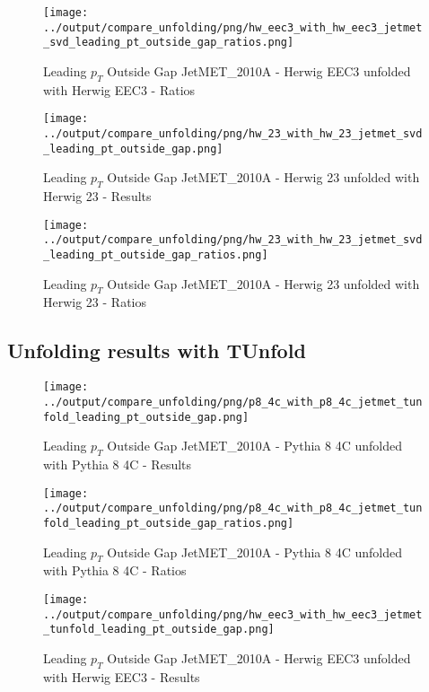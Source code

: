 \documentclass[11pt]{book}
\begin{document}
\begin{figure}[ht]
\centering
\texttt{[image: ../output/compare\_unfolding/png/hw\_eec3\_with\_hw\_eec3\_jetmet\_svd\_leading\_pt\_outside\_gap\_ratios.png]}
\caption{Leading $p_{T}$ Outside Gap JetMET\_2010A - Herwig EEC3 unfolded with Herwig EEC3 - Ratios}
\label{hw_eec3_hw_eec3_jetmet_svd_leading_pt_outside_gap_b}
\end{figure}

\begin{figure}[ht]
\centering
\texttt{[image: ../output/compare\_unfolding/png/hw\_23\_with\_hw\_23\_jetmet\_svd\_leading\_pt\_outside\_gap.png]}
\caption{Leading $p_{T}$ Outside Gap JetMET\_2010A - Herwig 23 unfolded with Herwig 23 - Results}
\label{hw_23_hw_23_jetmet_svd_leading_pt_outside_gap_a}
\end{figure}

\begin{figure}[ht]
\centering
\texttt{[image: ../output/compare\_unfolding/png/hw\_23\_with\_hw\_23\_jetmet\_svd\_leading\_pt\_outside\_gap\_ratios.png]}
\caption{Leading $p_{T}$ Outside Gap JetMET\_2010A - Herwig 23 unfolded with Herwig 23 - Ratios}
\label{hw_23_hw_23_jetmet_svd_leading_pt_outside_gap_b}
\end{figure}


\clearpage
\subsection{Unfolding results with TUnfold}

\begin{figure}[ht]
\centering
\texttt{[image: ../output/compare\_unfolding/png/p8\_4c\_with\_p8\_4c\_jetmet\_tunfold\_leading\_pt\_outside\_gap.png]}
\caption{Leading $p_{T}$ Outside Gap JetMET\_2010A - Pythia 8 4C unfolded with Pythia 8 4C - Results}
\label{p8_p8_jetmet_tunfold_leading_pt_outside_gap_a}
\end{figure}

\begin{figure}[ht]
\centering
\texttt{[image: ../output/compare\_unfolding/png/p8\_4c\_with\_p8\_4c\_jetmet\_tunfold\_leading\_pt\_outside\_gap\_ratios.png]}
\caption{Leading $p_{T}$ Outside Gap JetMET\_2010A - Pythia 8 4C unfolded with Pythia 8 4C - Ratios}
\label{p8_p8_jetmet_tunfold_leading_pt_outside_gap_b}
\end{figure}

\begin{figure}[ht]
\centering
\texttt{[image: ../output/compare\_unfolding/png/hw\_eec3\_with\_hw\_eec3\_jetmet\_tunfold\_leading\_pt\_outside\_gap.png]}
\caption{Leading $p_{T}$ Outside Gap JetMET\_2010A - Herwig EEC3 unfolded with Herwig EEC3 - Results}
\label{hw_eec3_hw_eec3_jetmet_tunfold_leading_pt_outside_gap_a}
\end{figure}
\end{document}
